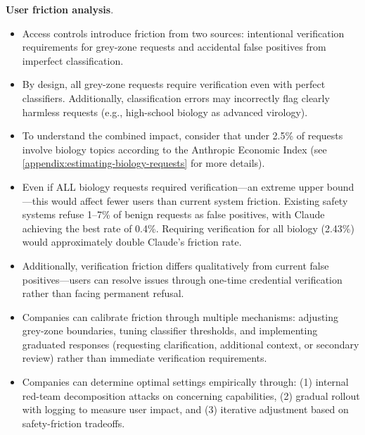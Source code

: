 \documentclass{article}
\theoremstyle{plain}
\theoremstyle{definition}
\theoremstyle{remark}
\begin{document}
\textbf{User friction analysis}.
\begin{itemize}
  \item Access controls introduce friction from two sources: intentional verification requirements for grey-zone requests and accidental false positives from imperfect classification.
  \item By design, all grey-zone requests require verification even with perfect classifiers. Additionally, classification errors may incorrectly flag clearly harmless requests (e.g., high-school biology as advanced virology).
  \item To understand the combined impact, consider that under 2.5\% of requests involve biology topics according to the Anthropic Economic Index \cite{handa2025economictasksperformedai} (see \cref{appendix:estimating-biology-requests} for more details).
  \item Even if ALL biology requests required verification—an extreme upper bound—this would affect fewer users than current system friction. Existing safety systems refuse 1--7\% of benign requests as false positives, with Claude achieving the best rate of 0.4\%. Requiring verification for all biology (2.43\%) would approximately double Claude's friction rate.
  \item Additionally, verification friction differs qualitatively from current false positives—users can resolve issues through one-time credential verification rather than facing permanent refusal.
  \item Companies can calibrate friction through multiple mechanisms: adjusting grey-zone boundaries, tuning classifier thresholds, and implementing graduated responses (requesting clarification, additional context, or secondary review) rather than immediate verification requirements.
  \item Companies can determine optimal settings empirically through: (1) internal red-team decomposition attacks on concerning capabilities, (2) gradual rollout with logging to measure user impact, and (3) iterative adjustment based on safety-friction tradeoffs.
\end{itemize}
\end{document}
